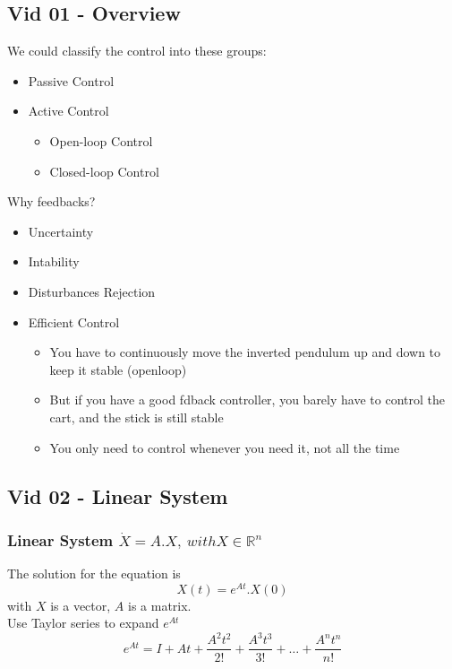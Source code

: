 \documentclass{article}
\begin{document}
\subsection{Vid 01 - Overview}

We could classify the control into these groups:
\begin{itemize}
  \item Passive Control
  \item Active Control
    \begin{itemize}
      \item Open-loop Control
      \item Closed-loop Control
    \end{itemize}
\end{itemize} 
Why feedbacks?
\begin{itemize}
  \item Uncertainty
  \item Intability
  \item Disturbances Rejection
  \item Efficient Control
    \begin{itemize}
      \item You have to continuously move the inverted pendulum up and down to keep it stable (openloop)
      \item But if you have a good fdback controller, you barely have to control the cart, and the stick is still stable
      \item You only need to control whenever you need it, not all the time
    \end{itemize}
\end{itemize}

\subsection{Vid 02 - Linear System} 
\subsubsection{Linear System $ \dot{X} = A.X, ~with X \in\mathbb{R}^{n} $}


The solution for the equation is 
\begin{equation}
  X(t) = e^{At}.X(0)
\end{equation}
with $X$ is a vector, $A$ is a matrix.
\\Use Taylor series to expand $e^{At}$ 
\begin{equation}
  e^{At} = I + At + \frac{ A^{2}t^{2} }{2!} + \frac{ A^{3}t^{3} }{3!} + \ldots + \frac{ A^{n}t^{n} }{n!}
\end{equation}
\end{document}
